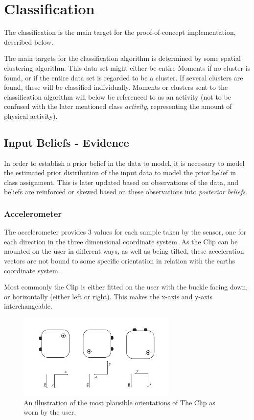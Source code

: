 \section{Classification}
The classification is the main target for the proof-of-concept 
implementation, described below. 

The main targets for the classification algorithm is determined by some 
spatial clustering algorithm. This data set might either be entire 
Moments if no cluster is found, or if the entire data set is regarded to
be a cluster. If several clusters are found, these will be classified 
individually. Moments or clusters sent to the classification algorithm 
will below be referenced to as an activity (not to be confused with the
later mentioned class \emph{activity}, representing the amount of
physical activity).

\subsection{Input Beliefs - Evidence}
In order to establish a prior belief in the data to model, it is 
necessary to model the estimated prior distribution of the input data to 
model the prior belief in class assignment. This is later updated based on 
observations of the data, and beliefs are reinforced or skewed based on 
these observations into \emph{posterior beliefs}.

\subsubsection{Accelerometer}
The accelerometer provides 3 values for each sample taken by the sensor, 
one for each direction in the three dimensional coordinate system. As the 
Clip can be mounted on the user in different ways, as well as being tilted, 
these acceleration vectors are not bound to some specific orientation in
relation with the earths coordinate system.

Most commonly the Clip is either fitted on the user with the buckle facing
down, or horizontally (either left or right). This makes the x-axis and
y-axis interchangeable.

\begin{figure}[ht]
    \centering
    \includegraphics[width=0.7\textwidth]{images/narrative_clip_orientation.pdf}
    \caption{ An illustration of the most plausible orientations of The Clip as 
        worn by the user. \label{fig:narrative-clip-orientation} }
\end{figure}

